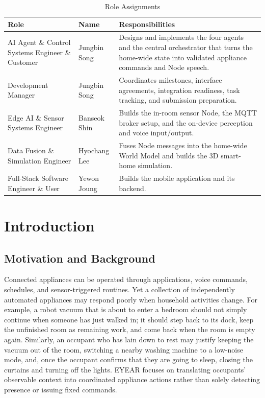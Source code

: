 \documentclass[conference]{IEEEtran}
\begin{document}
\begin{table}[!t]
\caption{Role Assignments}
\label{tab:roles}
\centering
\small
\begin{tabular}{L{0.22\textwidth}L{0.12\textwidth}L{0.58\textwidth}}
\toprule
\textbf{Role} & \textbf{Name} & \textbf{Responsibilities} \\
\midrule
AI Agent \& Control Systems Engineer \& Customer
& Jungbin Song
& Designs and implements the four agents and the central
orchestrator that turns the home-wide state into validated
appliance commands and Node speech. \\

Development Manager
& Jungbin Song
& Coordinates milestones, interface agreements, integration
readiness, task tracking, and submission preparation. \\

Edge AI \& Sensor Systems Engineer
& Banseok Shin
& Builds the in-room sensor Node, the MQTT broker setup, and the
on-device perception and voice input/output. \\

Data Fusion \& Simulation Engineer
& Hyochang Lee
& Fuses Node messages into the home-wide World Model and builds
the 3D smart-home simulation. \\

Full-Stack Software Engineer \& User
& Yewon Joung
& Builds the mobile application and its backend. \\
\bottomrule
\end{tabular}
\end{table}

\section{Introduction}

\subsection{Motivation and Background}

Connected appliances can be operated through applications, voice
commands, schedules, and sensor-triggered routines. Yet a
collection of independently automated appliances may respond
poorly when household activities change. For example, a robot
vacuum that is about to enter a bedroom should not simply continue
when someone has just walked in; it should step back to its dock,
keep the unfinished room as remaining work, and come back when the
room is empty again. Similarly, an occupant who has lain down to
rest may justify keeping the vacuum out of the room, switching a
nearby washing machine to a low-noise mode, and, once the occupant
confirms that they are going to sleep, closing the curtains and
turning off the lights. EYEAR focuses on translating occupants'
observable context into coordinated appliance actions rather than
solely detecting presence or issuing fixed commands.
\end{document}
